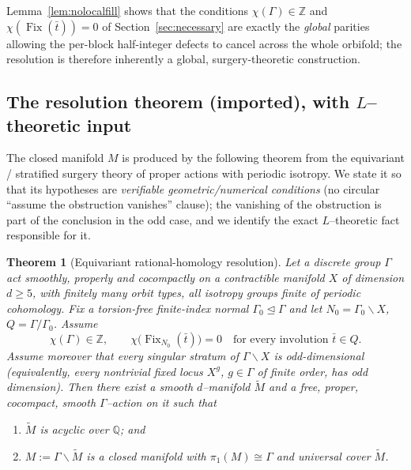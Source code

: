 \documentclass[12pt]{article}
\newcommand{\bQ}{\mathbb{Q}}
\newcommand{\bZ}{\mathbb{Z}}
\newcommand{\Fix}{\operatorname{Fix}}
\newtheorem{theorem}{Theorem}
\theoremstyle{definition}
\begin{document}
Lemma~\ref{lem:nolocalfill} shows that the conditions $\chi(\Gamma)\in\bZ$ and
$\chi(\Fix(\bar t))=0$ of Section~\ref{sec:necessary} are exactly the
\emph{global} parities allowing the per-block half-integer defects to cancel
across the whole orbifold; the resolution is therefore inherently a global,
surgery-theoretic construction.

\subsection{The resolution theorem (imported), with $L$--theoretic input}

The closed manifold $M$ is produced by the following theorem from the equivariant
/ stratified surgery theory of proper actions with periodic isotropy.  We state it
so that its hypotheses are \emph{verifiable geometric/numerical conditions} (no
circular ``assume the obstruction vanishes'' clause); the vanishing of the
obstruction is part of the conclusion in the odd case, and we identify the exact
$L$--theoretic fact responsible for it.

\begin{theorem}[Equivariant rational-homology resolution]\label{thm:resolution}
Let a discrete group $\Gamma$ act smoothly, properly and cocompactly on a
contractible manifold $X$ of dimension $d\ge5$, with finitely many orbit types,
all isotropy groups finite of \emph{periodic cohomology}.  Fix a torsion-free
finite-index normal $\Gamma_0\trianglelefteq\Gamma$ and let $N_0=\Gamma_0\backslash
X$, $Q=\Gamma/\Gamma_0$.  Assume
\begin{equation}\label{eq:hyp}
   \chi(\Gamma)\in\bZ,
   \qquad
   \chi\bigl(\Fix_{N_0}(\bar t)\bigr)=0
   \quad\text{for every involution }\bar t\in Q .
\end{equation}
Assume moreover that every singular stratum of $\Gamma\backslash X$ is
odd-dimensional \textup{(}equivalently, every nontrivial fixed locus $X^{g}$,
$g\in\Gamma$ of finite order, has odd dimension\textup{)}.  Then there exist a
smooth $d$--manifold $\widetilde M$ and a free, proper, cocompact, smooth
$\Gamma$--action on it such that
\begin{enumerate}
\item[\textup{(i)}] $\widetilde M$ is acyclic over $\bQ$; and
\item[\textup{(ii)}] $M:=\Gamma\backslash\widetilde M$ is a closed manifold with
$\pi_1(M)\cong\Gamma$ and universal cover $\widetilde M$.
\end{enumerate}
\end{theorem}
\end{document}
